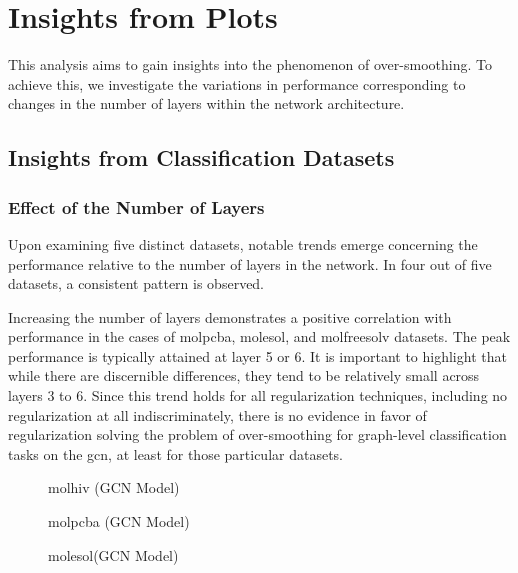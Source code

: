 \section{Insights from Plots}
This analysis aims to gain insights into the phenomenon of over-smoothing. To achieve this, we investigate the variations in performance corresponding to changes in the number of layers within the network architecture.

\subsection{Insights from Classification Datasets}
\subsubsection{Effect of the Number of Layers}
Upon examining five distinct datasets, notable trends emerge concerning the performance relative to the number of layers in the network. In four out of five datasets, a consistent pattern is observed.

Increasing the number of layers demonstrates a positive correlation with performance in the cases of molpcba, molesol, and molfreesolv datasets. The peak performance is typically attained at layer 5 or 6. It is important to highlight that while there are discernible differences, they tend to be relatively small across layers 3 to 6. Since this trend holds for all regularization techniques, including no regularization at all indiscriminately, there is no evidence in favor of regularization solving the problem of over-smoothing for graph-level classification tasks on the \ac{gcn}, at least for those particular datasets.

\begin{figure}
    \centering
    \caption{molhiv (GCN Model)}
    \label{fig:gcn-molfreesolv}
\end{figure}

\begin{figure}
    \centering
    \caption{molpcba (GCN Model)}
    \label{fig:gcn-molfreesolv}
\end{figure}


\begin{figure}
    \centering
    \caption{molesol(GCN Model)}
    \label{fig:gcn-molfreesolv}
\end{figure}

